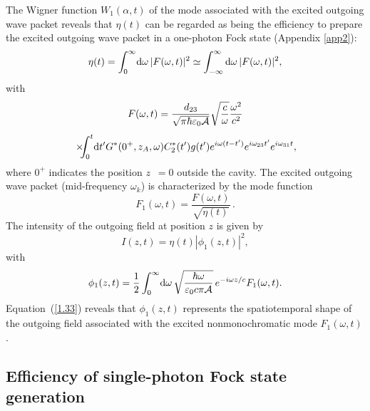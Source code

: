 \documentclass[pra, twocolumn]{revtex4}
\newcommand{\D}{\mbox{\rm d}}
\begin{document}
The Wigner function $W_1(\alpha,t)$
of the mode
associated with the excited outgoing wave packet
reveals that
$\eta(t)$ can be regarded as being the efficiency
to prepare the excited outgoing wave packet in
a one-photon Fock state (Appendix \ref{app2}):
\begin{equation}
 \label{1.29}
         \eta(t)
=
\int_0^{\infty}\!
         \D\omega\, |F(\omega ,t)| ^2
\simeq
\int_{-\infty}^\infty
         \D\omega\, |F(\omega ,t)| ^2
,
 \end{equation}
with
\begin{multline}
  \label{1.30}
    F(\omega, t)=
    \frac{d_{23}}{\sqrt{\pi \hbar \varepsilon _0  \mathcal{A}}}
    \sqrt{\frac{c}{\omega}}
    \frac{\omega^2}{c^2}
\\[1ex]\!\!\!
\times\!
\!\!      \int ^t _0\! \D t'
     G^*(0^+, z_A, \omega)
     C_2^*(t')g(t') e^{i\omega(t-t')}
     e^{i
\omega
_{23}t'}
 e^{i\omega_{31}t}
,\!\!\!\!
\end{multline}
where $0^+$ indicates the position \mbox{$z$ $\!=0$} outside the cavity.
%
The excited outgoing wave packet
%
(mid-frequency $\omega_k$)
is characterized by the mode function
\begin{equation}
  \label{1.31}
    F_1(\omega,t)
    = \frac{F(\omega , t)}{\sqrt{\eta(t)}}\,
.
\end{equation}
The intensity of the outgoing field at position $z$ is given by
\begin{equation}
  \label{1.33}
   I(z,t)
  =
  \eta(t)
  |\phi_1(z,t)|^2
,
\end{equation}
with
\begin{equation}
  \label{1.35}
\phi_1(z, t)
    =
    \frac{1}{2}
     \int_0^{\infty}\!
     \D\omega\,
      \sqrt{\frac{\hbar\omega}{\varepsilon_0 c \pi\mathcal{A}
        }}\,
     e^{-i \omega z/c}
    F_1(\omega, t)
.
\end{equation}
Equation~(\ref{1.33}) reveals that $\phi_1(z,t)$
represents the spatiotemporal shape of the
outgoing field associated with the excited nonmonochromatic mode
$F_1(\omega,t)$. 


\subsection{Efficiency of single-photon Fock state generation}
\label{sec5}
\end{document}

